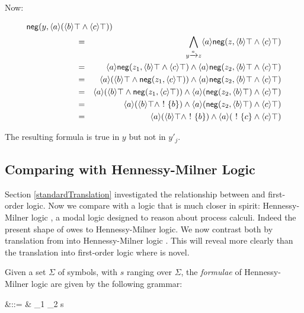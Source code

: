 \NI Now:

\begin{eqnarray*}
\lefteqn{\mathsf{neg}(y, \langle a \rangle (\langle b \rangle \top \AND \langle c \rangle \top))}\qquad \qquad \qquad  \\
& = & \bigwedge\limits_{y \xrightarrow{a} z} \langle a \rangle \mathsf{neg}(z, \langle b \rangle \top \AND \langle c \rangle \top)  \\
& = & \langle a \rangle \mathsf{neg}(z_1, \langle b \rangle \top \AND \langle c \rangle \top) \AND \langle a \rangle\mathsf{neg}(z_2, \langle b \rangle \top \AND \langle c \rangle \top)  \\
& = & \langle a \rangle (\langle b \rangle \top \AND \mathsf{neg}(z_1, \langle c \rangle \top)) \AND \langle a \rangle\mathsf{neg}(z_2, \langle b \rangle \top \AND \langle c \rangle \top)  \\
& = & \langle a \rangle (\langle b \rangle \top \AND \mathsf{neg}(z_1, \langle c \rangle \top)) \AND \langle a \rangle(\mathsf{neg}(z_2, \langle b \rangle \top) \AND \langle c \rangle \top)  \\
& = & \langle a \rangle (\langle b \rangle \top \AND \fBang \{b\}) \AND \langle a \rangle(\mathsf{neg}(z_2, \langle b \rangle \top) \AND \langle c \rangle \top)  \\
& = & \langle a \rangle (\langle b \rangle \top \AND \fBang \{b\}) \AND \langle a \rangle(\fBang \{c\} \AND \langle c \rangle \top) 
\end{eqnarray*}

\NI The resulting formula is true in $y$ but not in $y'_j$.


\subsection{Comparing \ELABR{} with Hennessy-Milner Logic}

Section \ref{standardTranslation} investigated the relationship
between \ELABR{} and first-order logic. Now we compare \ELABR{} with
a logic that is much closer in spirit: Hennessy-Milner logic
\cite{HennessyM:alglawfndac}, a modal logic designed to reason about
process calculi. Indeed the present shape of \ELABR{} owes to
Hennessy-Milner logic. We now contrast both by translation from \ELABR{} into Hennessy-Milner logic . 
This will reveal more clearly than the translation into
first-order logic where \ELABR{} is novel.

Given a set $\Sigma$ of symbols, with $s$ ranging over
$\Sigma$, the \emph{formulae} of Hennessy-Milner logic are given
by the following grammar:
\begin{GRAMMAR}
  \phi 
     &\quad ::= \quad & 
  \top \fOr \phi_1 \AND \phi_2 \fOr \langle s \rangle \phi \fOr \neg \phi 
\end{GRAMMAR}

